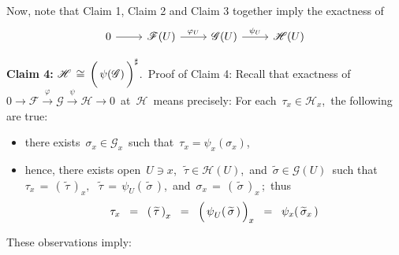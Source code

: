 \vskip 0.5cm
\noindent
Now, note that Claim 1, Claim 2 and Claim 3 together imply the exactness of
\begin{equation*}
\begin{tikzcd}
0
	\arrow[r] &
\mathscr{F}(U)
	\arrow[r, "\varphi_{U}"] &
\mathscr{G}(U)
	\arrow[r, "\psi_{U}"] &
\mathscr{H}(U)
\end{tikzcd}
\end{equation*}


\vskip 0.5cm
\noindent
\textbf{Claim 4:}\; $\mathscr{H} \,\cong\, \left(\,\overset{{\color{white}1}}{\psi(\mathscr{G})}\,\right)^{\sharp}$.\,
\vskip 0.2cm
\noindent
Proof of Claim 4:\;
Recall that exactness of
\,$
0
\longrightarrow \mathscr{F}
\overset{\varphi}{\longrightarrow} \mathscr{G}
\overset{\psi}{\longrightarrow} \mathscr{H}
\longrightarrow 0
$\,
at \,$\mathscr{H}$\, means precisely:
For each \,$\tau_{x} \in \mathscr{H}_{x}$,\, the following are true:
\begin{itemize}
\item
	there exists \,$\sigma_{x} \in \mathscr{G}_{x}$\, such that \,$\tau_{x} = \psi_{x}(\sigma_{x})$,
\item
	hence, there exists open
	\,$U \ni x$,\, \,$\widetilde{\tau} \in \mathscr{H}(U)$,\, and \,$\widetilde{\sigma} \in \mathscr{G}(U)$\,
	such that
	\,$\tau_{x} \,=\, \left(\,\widetilde{\tau}\,\right)_{x},$\,
	\,$\widetilde{\tau} \,=\, \psi_{U}(\,\widetilde{\sigma}\,)$,\, and
	\,$\sigma_{x} \,=\, \left(\,\widetilde{\sigma}\,\right)_{x}$\,;\, thus
	\begin{equation*}
	\tau_{x}
	\;\; = \;\;
		\left(\,\widetilde{\tau}\,\right)_{x}
	\;\; = \;\;
		\left(\,\overset{{\color{white}.}}{\psi}_{U}(\,\widetilde{\sigma}\,)\,\right)_{x}
	\;\; = \;\;
		\psi_{x}\!\left(\,\widetilde{\sigma}_{x}\,\right)
	\end{equation*}
\end{itemize}
These observations imply:

